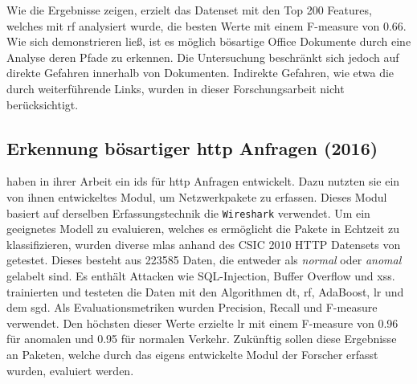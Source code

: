 \documentclass[
    12pt, %
    DIV10,
    ngerman, %
    a4paper, %
    oneside, %
    titlepage, %
    parskip=half, %
    headings=normal, %
    listof=totoc, %
    bibliography=totoc, %
    index=totoc, %
    captions=tableheading, %
    final %
]{scrreprt}
\begin{document}
Wie die Ergebnisse zeigen, erzielt das Datenset mit den Top 200 Features, welches mit \ac{rf} analysiert wurde, die besten Werte mit einem F-measure von 0.66.
Wie sich demonstrieren lie{\ss}, ist es möglich bösartige Office Dokumente durch eine Analyse deren Pfade zu erkennen. 
Die Untersuchung beschränkt sich jedoch auf direkte Gefahren innerhalb von Dokumenten. Indirekte Gefahren, wie etwa die durch weiterführende Links, wurden in dieser Forschungsarbeit nicht berücksichtigt.
\subsection{Erkennung bösartiger \acs{http} Anfragen (2016)}\label{csic}
\textcite{Pham2016} haben in ihrer Arbeit ein \ac{ids} für \ac{http} Anfragen entwickelt. Dazu nutzten sie ein von ihnen entwickeltes Modul, um Netzwerkpakete zu erfassen. Dieses Modul basiert auf derselben Erfassungstechnik die \texttt{Wireshark} verwendet. Um ein geeignetes Modell zu evaluieren, welches es ermöglicht die Pakete in Echtzeit zu klassifizieren, wurden diverse \ac{mlas} anhand des CSIC 2010 HTTP Datensets von \textcite{csic} getestet. Dieses besteht aus 223585 Daten, die entweder als \emph{normal} oder \emph{anomal} gelabelt sind. Es enthält Attacken wie SQL-Injection, Buffer Overflow und \ac{xss}. \textcite{Pham2016} trainierten und testeten die Daten mit den Algorithmen \ac{dt}, \ac{rf}, AdaBoost, \ac{lr} und dem \ac{sgd}. Als Evaluationsmetriken wurden Precision, Recall und F-measure verwendet. Den höchsten dieser Werte erzielte \ac{lr} mit einem F-measure von 0.96 für anomalen und 0.95 für normalen Verkehr. Zukünftig sollen diese Ergebnisse an Paketen, welche durch das eigens entwickelte Modul der Forscher erfasst wurden, evaluiert werden.
%
\end{document}

